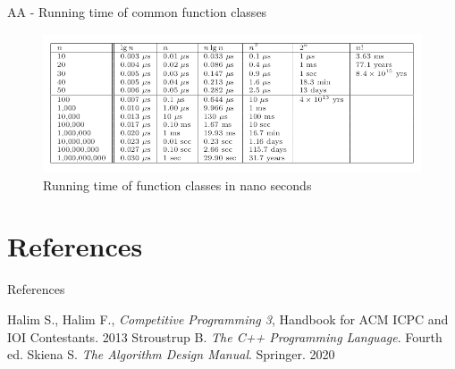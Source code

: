 \documentclass{beamer}
\begin{document}
\begin{frame}{AA - Running time of common function classes}
    \begin{figure}
        \centering
        \includegraphics[scale=0.4]{imgs/1-CompetitiveProgramming/running-time-ns.png}
        \caption{Running time of function classes in nano seconds}
        \label{fig:my_label}
    \end{figure}
\end{frame}

\section*{References}
\begin{frame}{References}
    \begin{thebibliography}{}
         Halim S., Halim F., \textit{Competitive Programming 3}, Handbook for ACM ICPC and IOI Contestants. 2013
         Stroustrup B. \textit{The C++ Programming Language}. Fourth ed. 
         Skiena S. \textit{The Algorithm Design Manual}. Springer. 2020
    \end{thebibliography}
\end{frame}
\end{document}
